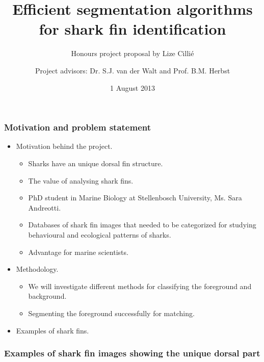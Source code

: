 \documentclass{beamer}
\title{Efficient segmentation algorithms for shark fin identification}
\subtitle{Honours project proposal by Lize Cilli\'{e}}
\author{Project advisors: Dr. S.J. van der Walt and Prof. B.M.
Herbst}
\date{1 August 2013}
\institute{Department of Applied Mathematics, Stellenbosch University}
\newcommand{\myitem}{\item[$-$]}
\begin{document}
\maketitle


\begin{frame}
\frametitle{Motivation and problem statement}
\begin{itemize}

\item Motivation behind the project.
\begin{itemize}
\myitem Sharks have an unique dorsal fin structure.
\myitem The value of analysing shark fins.
\myitem PhD student in Marine Biology at Stellenbosch University, Ms. Sara
Andreotti.
\myitem Databases of shark fin images that needed to be categorized for studying
behavioural and ecological patterns of sharks.
\myitem Advantage for marine scientists.
\end{itemize}
\item Methodology.
\begin{itemize}
 \myitem We will investigate different methods for classifying the foreground and
background.
 \myitem Segmenting the foreground successfully for matching. 
\end{itemize}

\item Examples of shark fins.
\end{itemize}
\end{frame}


\begin{frame}
\frametitle{Examples of shark fin images showing the unique dorsal part}
\begin{figure}
\centering
\mbox{ \quad
{}}
\end{figure}
\begin{figure}
\centering
\mbox{ \quad
{}}
\end{figure}
\end{frame}
\end{document}
